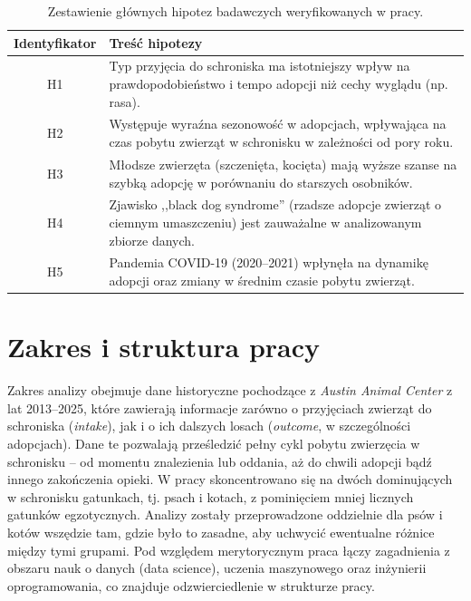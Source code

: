\begin{table}[htbp]
\centering
\caption{Zestawienie głównych hipotez badawczych weryfikowanych w pracy.}
\label{tab:hipotezy_podsumowanie}
\renewcommand{\arraystretch}{1.3}
\begin{tabular}{|c|p{12cm}|}
\hline
\textbf{Identyfikator} & \textbf{Treść hipotezy} \\
\hline
H1 & Typ przyjęcia do schroniska ma istotniejszy wpływ na prawdopodobieństwo i tempo adopcji niż cechy wyglądu (np. rasa). \\
\hline
H2 & Występuje wyraźna sezonowość w adopcjach, wpływająca na czas pobytu zwierząt w schronisku w zależności od pory roku. \\
\hline
H3 & Młodsze zwierzęta (szczenięta, kocięta) mają wyższe szanse na szybką adopcję w porównaniu do starszych osobników. \\
\hline
H4 & Zjawisko ,,black dog syndrome'' (rzadsze adopcje zwierząt o ciemnym umaszczeniu) jest zauważalne w analizowanym zbiorze danych. \\
\hline
H5 & Pandemia COVID-19 (2020--2021) wpłynęła na dynamikę adopcji oraz zmiany w średnim czasie pobytu zwierząt. \\
\hline
\end{tabular}
\end{table}

\section{Zakres i struktura pracy}\label{sec:zakres-struktura}

Zakres analizy obejmuje dane historyczne pochodzące z \emph{Austin Animal Center} z lat 2013–2025, które zawierają informacje zarówno o przyjęciach zwierząt do schroniska (\emph{intake}), jak i o ich dalszych losach (\emph{outcome}, w szczególności adopcjach). Dane te pozwalają prześledzić pełny cykl pobytu zwierzęcia w schronisku – od momentu znalezienia lub oddania, aż do chwili adopcji bądź innego zakończenia opieki. W pracy skoncentrowano się na dwóch dominujących w schronisku gatunkach, tj. psach i kotach, z pominięciem mniej licznych gatunków egzotycznych. Analizy zostały przeprowadzone oddzielnie dla psów i kotów wszędzie tam, gdzie było to zasadne, aby uchwycić ewentualne różnice między tymi grupami. Pod względem merytorycznym praca łączy zagadnienia z obszaru nauk o danych (data science), uczenia maszynowego oraz inżynierii oprogramowania, co znajduje odzwierciedlenie w strukturze pracy.

